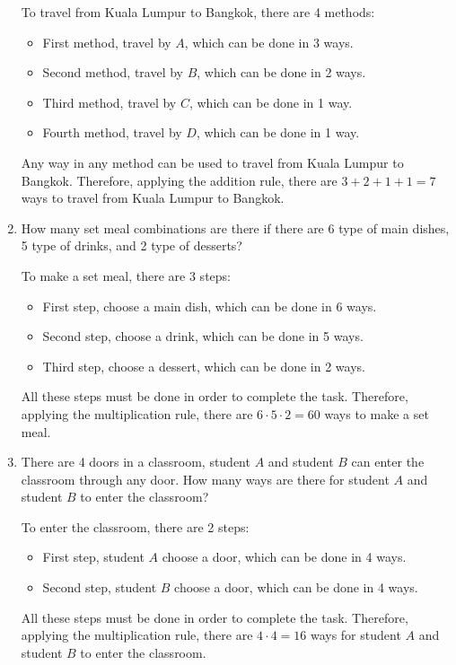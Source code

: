 \documentclass{report}
\begin{document}
\begin{multicols}{2}
\begin{enumerate}
          To travel from Kuala Lumpur to Bangkok, there are 4 methods:
          \begin{itemize}
            \item First method, travel by $A$, which can be done in 3 ways.
            \item Second method, travel by $B$, which can be done in 2 ways.
            \item Third method, travel by $C$, which can be done in 1 way.
            \item Fourth method, travel by $D$, which can be done in 1 way.
          \end{itemize}
          Any way in any method can be used to travel from Kuala Lumpur to Bangkok. Therefore, applying the addition rule, there are $3 + 2 + 1 + 1 = 7$ ways to travel from Kuala Lumpur to Bangkok.

    \item How many set meal combinations are there if there are 6 type of main dishes, 5
          type of drinks, and 2 type of desserts? \sol{}

          To make a set meal, there are 3 steps:
          \begin{itemize}
            \item First step, choose a main dish, which can be done in 6 ways.
            \item Second step, choose a drink, which can be done in 5 ways.
            \item Third step, choose a dessert, which can be done in 2 ways.
          \end{itemize}
          All these steps must be done in order to complete the task. Therefore, applying the multiplication rule, there are $6 \cdot 5 \cdot 2 = 60$ ways to make a set meal.

    \item There are 4 doors in a classroom, student $A$ and student $B$ can enter the
          classroom through any door. How many ways are there for student $A$ and student
          $B$ to enter the classroom? \sol{}

          To enter the classroom, there are 2 steps:
          \begin{itemize}
            \item First step, student $A$ choose a door, which can be done in 4 ways.
            \item Second step, student $B$ choose a door, which can be done in 4 ways.
          \end{itemize}
          All these steps must be done in order to complete the task. Therefore, applying the multiplication rule, there are $4 \cdot 4 = 16$ ways for student $A$ and student $B$ to enter the classroom.


\end{enumerate}
\end{multicols}
\end{document}
